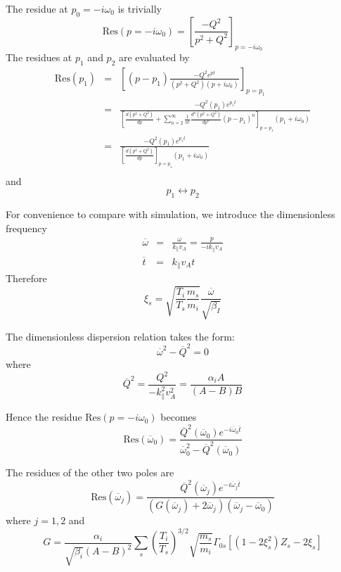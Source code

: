 \documentclass[11pt, oneside]{article}   	%
\begin{document}
The residue at $p_0 = - i\omega_0$ is trivially 
%
\begin{equation}
\mathrm{Res}(p = - i\omega_0)  = \left[\frac{-Q^2}{p^2 + Q^2} \right]_{p=-i\omega_0}
\end{equation}
The residues at $p_1$ and $p_2$ are evaluated by
%
\begin{eqnarray}
\mathrm{Res}(p_1)&=& \left[ (p-p_1) \frac{-Q^2 e^{pt}}{(p^2+Q^2)(p+i\omega_0)} \right]_{p=p_1} \\
&=& \frac{-Q^2(p_1) e^{p_1t}}{\left[\frac{d (p^2+Q^2)}{dp} +  \sum_{n=2}^\infty \frac{1}{n!} \frac{d^n(p^2+Q^2)}{dp^n} (p-p_1)^n \right]_{p=p_1}(p_1 + i\omega_0)} \\
&=& \frac{-Q^2(p_1) e^{p_1t}}{\left[\frac{d (p^2+Q^2)}{dp} \right]_{p=p_1}(p_1 + i\omega_0)} \\
\end{eqnarray}
and
%
\begin{equation}
p_1 \leftrightarrow p_2
\end{equation}

For convenience to compare with simulation, we introduce the dimensionless frequency 
%
\begin{eqnarray}
\overline{\omega} &=& \frac{\omega}{k_\parallel v_A} = \frac{p}{-i k_\parallel v_A} \\
\overline{t} &=& k_\parallel v_A t
\end{eqnarray}
Therefore 
%
\begin{equation}
\xi_s = \sqrt{\frac{T_i}{T_s}\frac{m_s}{m_i}} \frac{\overline{\omega}}{\sqrt{\beta_I}}
\end{equation}

The dimensionless dispersion relation takes the form:
\begin{equation}
\overline{\omega}^2 - \overline{Q}^2= 0
\end{equation}
where 
\begin{equation}
\overline{Q}^2 = \frac{Q^2}{-k_\parallel^2 v_A^2} =  \frac{\alpha_i A}{(A-B)B} 
\end{equation}

Hence the residue $\mathrm{Res}(p=-i\omega_0)$ becomes
%
\begin{equation}
\mathrm{Res}(\overline{\omega}_0) = \frac{\overline{Q}^2(\overline{\omega}_0) e^{-i \overline{\omega}_0 \overline{t}}}{\overline{\omega}_0 ^2 - \overline{Q}^2(\overline{\omega}_0)}
\end{equation}

The residues of the other two poles are 
\begin{equation}
\mathrm{Res}(\overline{\omega}_j) = \frac{\overline{Q}^2(\overline{\omega}_j) e^{-i \overline{\omega}_j \overline{t}}}{(G(\overline{\omega}_j) + 2 \overline{\omega}_j)(\overline{\omega}_j  - \overline{\omega}_0)}
\end{equation}
where $j = 1, 2$ and 
\begin{equation}
G =  \frac{\alpha_i}{\sqrt{\beta_i} (A-B)^2} \sum_s \left(\frac{T_i}{T_s}\right)^{3/2} \sqrt{\frac{m_s}{m_i}} \Gamma_{0s} \left[(1-2\xi_s^2)Z_s - 2 \xi_s\right]
\end{equation}
\end{document}
